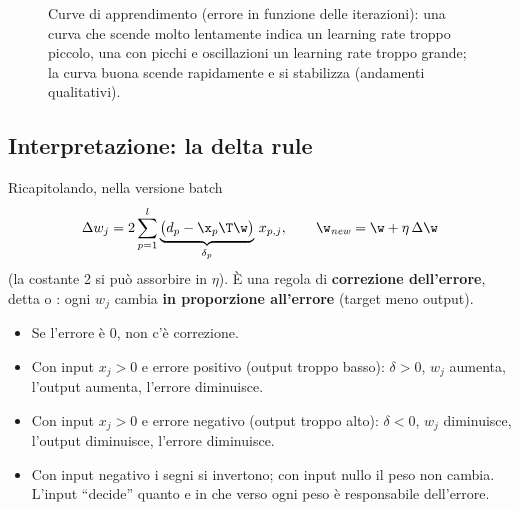 \begin{figure}[ht]
\centering
{}
\caption{Curve di apprendimento (errore in funzione delle iterazioni): una curva che scende molto lentamente
indica un learning rate troppo piccolo, una con picchi e oscillazioni un learning rate troppo grande; la curva
buona scende rapidamente e si stabilizza (andamenti qualitativi).}
\label{fig:curve-eta}
\end{figure}

\subsection{Interpretazione: la delta rule}

Ricapitolando, nella versione batch
\begin{equation}\label{eq:delta-rule}
\Delta w_j = 2\sum_{p=1}^{l}\underbrace{\big(d_p-\x_p\T\w\big)}_{\delta_p}\,x_{p,j}, \qquad \w_{\mathit{new}} = \w + \eta\,\Delta\w
\end{equation}
(la costante 2 si può assorbire in $\eta$). È una regola di \textbf{correzione dell'errore}, detta
 o : ogni $w_j$ cambia \textbf{in proporzione all'errore}
(target meno output).
\begin{itemize}
  \item Se l'errore è 0, non c'è correzione.
  \item Con input $x_j>0$ e errore positivo (output troppo basso): $\delta>0$, $w_j$ aumenta, l'output aumenta,
        l'errore diminuisce.
  \item Con input $x_j>0$ e errore negativo (output troppo alto): $\delta<0$, $w_j$ diminuisce, l'output
        diminuisce, l'errore diminuisce.
  \item Con input negativo i segni si invertono; con input nullo il peso non cambia. L'input ``decide'' quanto e
        in che verso ogni peso è responsabile dell'errore.
\end{itemize}

